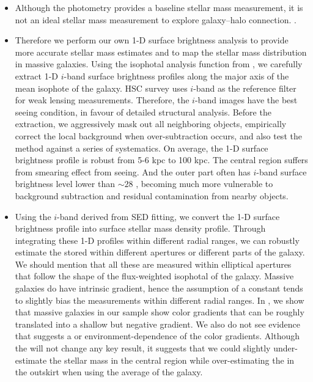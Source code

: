 \documentclass[a4paper,fleqn,usenatbib]{mnras}
\begin{document}
	\begin{itemize}

		\item Although the \cmod{} photometry provides a baseline stellar mass measurement,
			it is not an ideal stellar mass measurement to explore galaxy--halo connection.
			.

		\item Therefore we perform our own 1-D surface brightness analysis to provide
			more accurate stellar mass estimates and to map the stellar mass
			distribution in massive galaxies.
			Using the \ellipse{} isophotal analysis function from \iraf{}, we carefully
			extract 1-D $i$-band surface brightness profiles along the major axis of the
            mean isophote of the galaxy.
            HSC survey uses $i$-band as the reference filter for weak lensing measurements.
            Therefore, the $i$-band images have the best seeing condition, in favour of
            detailed structural analysis.
			Before the extraction, we aggressively mask out all neighboring objects,
			empirically correct the local background when over-subtraction occurs, and
			also test the method against a series of systematics.
			On average, the 1-D surface brightness profile is robust from 5-6 kpc to 100 kpc.
			The central region suffers from smearing effect from seeing.
			And the outer part often has $i$-band surface brightness level lower than
			$\sim 28$ \sb{}, becoming much more vulnerable to background subtraction
			and residual contamination from nearby objects.

		\item Using the $i$-band \mlratio{} derived from SED fitting, we convert the
			1-D surface brightness profile into surface stellar mass density profile.
            Through integrating these 1-D profiles within different radial ranges, we
            can robustly estimate the \mstar{} stored within different apertures or
            different parts of the galaxy.
            We should mention that all these \mstar{} are measured within elliptical
            apertures that follow the shape of the flux-weighted isophotal of the galaxy.
            Massive galaxies do have intrinsic \mlratio{} gradient, hence the assumption of
            a constant \mlratio{} tends to slightly bias the \mstar{} measurements within
            different radial ranges.
            In \citet{Huang2018b}, we show that massive galaxies in our sample show
            color gradients that can be roughly translated into a shallow but negative
            \mlratio{} gradient.
            We also do not see evidence that suggests a \mstar{} or environment-dependence
            of the color gradients.
            Although the \mlratio{} will not change any key result, it suggests that we
            could slightly under-estimate the stellar mass in the central region while
            over-estimating the \mstar{} in the outskirt when using the average \mlratio{}
            of the galaxy.

	\end{itemize}
\end{document}
